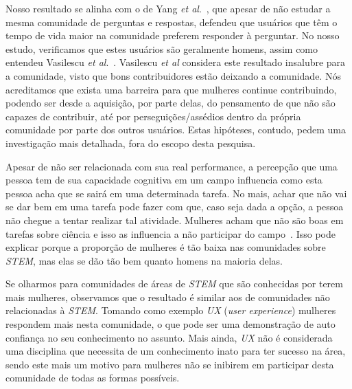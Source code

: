 Nosso resultado se alinha com o de Yang \textit{et al}.~\cite{yang2010activity}, que apesar de não estudar a mesma comunidade de perguntas e respostas, defendeu que usuários que têm o tempo de vida maior na comunidade preferem responder à perguntar. No nosso estudo, verificamos que estes usuários são geralmente homens, assim como entendeu Vasilescu \textit{et al}.~\cite{Vasilescu27092013}. Vasilescu \textit{et al} considera este resultado insalubre para a comunidade, visto que bons contribuidores estão deixando a comunidade. Nós acreditamos que exista uma barreira para que mulheres continue contribuindo, podendo ser desde a aquisição, por parte delas, do pensamento de que não são capazes de contribuir, até por perseguições/assédios dentro da própria comunidade por parte dos outros usuários. Estas hipóteses, contudo, pedem uma investigação mais detalhada, fora do escopo desta pesquisa.

Apesar de não ser relacionada com sua real performance, a percepção que uma pessoa tem de sua capacidade cognitiva em um campo influencia como esta pessoa acha que se sairá em uma determinada tarefa. No mais, achar que não vai se dar bem em uma tarefa pode fazer com que, caso seja dada a opção, a pessoa não chegue a tentar realizar tal atividade. Mulheres acham que não são boas em tarefas sobre ciência e isso as influencia a não participar do campo~\cite{ehrlinger2003chronic}. Isso pode explicar porque a proporção de mulheres é tão baixa nas comunidades sobre \emph{STEM}, mas elas se dão tão bem quanto homens na maioria delas.


Se olharmos para comunidades de áreas de \emph{STEM} que são conhecidas por terem mais mulheres, observamos que o resultado é similar aos de comunidades não relacionadas à \emph{STEM}. Tomando como exemplo \emph{UX} (\textit{user experience}) mulheres respondem mais nesta comunidade, o que pode ser uma demonstração de auto confiança no seu conhecimento no assunto. Mais ainda, \emph{UX} não é considerada uma disciplina que necessita de um conhecimento inato para ter sucesso na área, sendo este mais um motivo para mulheres não se inibirem em participar desta comunidade de todas as formas possíveis. 

